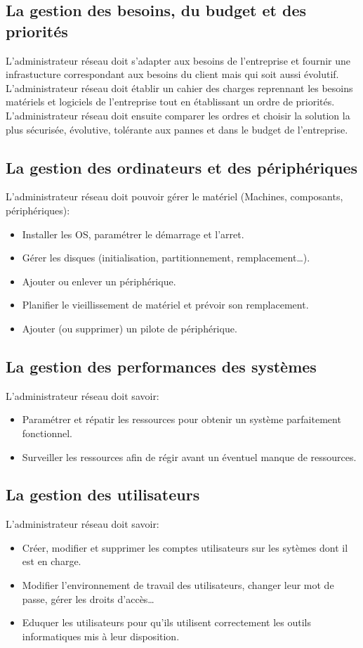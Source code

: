 \documentclass[10pt,a4paper]{article}
\begin{document}
 \subsection{La gestion des besoins, du budget et des priorités}
 L'administrateur réseau doit s'adapter aux besoins de l'entreprise et fournir une infrastucture correspondant aux besoins du client mais qui soit aussi évolutif.\\
 L'administrateur réseau doit établir un cahier des charges reprennant les besoins matériels et logiciels de l'entreprise tout en établissant un ordre de priorités.\\
 L'administrateur réseau doit ensuite comparer les ordres et choisir la solution la plus sécurisée, évolutive, tolérante aux pannes et dans le budget de l'entreprise.

 \subsection{La gestion des ordinateurs et des périphériques}
 L'administrateur réseau doit pouvoir gérer le matériel (Machines, composants, périphériques):
 \begin{itemize}
	 \item Installer les OS, paramétrer le démarrage et l'arret.
	 \item Gérer les disques (initialisation, partitionnement, remplacement\ldots).
	 \item Ajouter ou enlever un périphérique.
	 \item Planifier le vieillissement de matériel et prévoir son remplacement.
	 \item Ajouter (ou supprimer) un pilote de périphérique.
 \end{itemize}

 \subsection{La gestion des performances des systèmes}
 L'administrateur réseau doit savoir:
 \begin{itemize}
	 \item Paramétrer et répatir les ressources pour obtenir un système parfaitement fonctionnel.
	 \item Surveiller les ressources afin de régir avant un éventuel manque de ressources.
 \end{itemize}

 \subsection{La gestion des utilisateurs}
 L'administrateur réseau doit savoir:
 \begin{itemize}
	 \item Créer, modifier et supprimer les comptes utilisateurs sur les sytèmes dont il est en charge.
	 \item Modifier l'environnement de travail des utilisateurs, changer leur mot de passe, gérer les droits d'accès\ldots
	 \item Eduquer les utilisateurs pour qu'ils utilisent correctement les outils informatiques mis à leur disposition.
 \end{itemize}
\end{document}
